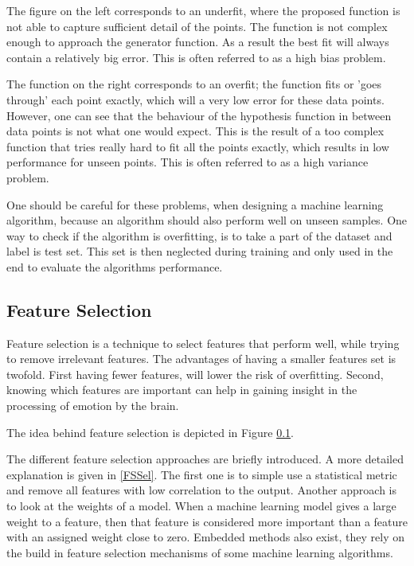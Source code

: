 \npar

The figure on the left corresponds to an underfit, where the proposed function is not able to capture sufficient detail of the points. The function is not complex enough to approach the generator function. As a result the best fit will always contain a relatively big error. This is often referred to as a high bias problem. 

\npar

The function on the right corresponds to an overfit; the function fits or 'goes through' each point exactly, which will a very low error for these data points. However, one can see that the behaviour of the hypothesis function in between data points is not what one would expect. This is the result of a too complex function that tries really hard to fit all the points exactly, which results in low performance for unseen points. This is often referred to as a high variance problem.

\npar

One should be careful for these problems, when designing a machine learning algorithm, because an algorithm should also perform well on unseen samples. One way to check if the algorithm is overfitting, is to take a part of the dataset and label is test set. This set is then neglected during training and only used in the end to evaluate the algorithms performance.

\subsection{Feature Selection}
Feature selection is a technique to select features that perform well, while trying to remove irrelevant features\citep{rfPaper}. The advantages of having a smaller features set is twofold. First having fewer features, will lower the risk of overfitting\citep{rfPaper}. Second, knowing which features are important can help in gaining insight in the processing of emotion by the brain. 

\npar

The idea behind feature selection is depicted in Figure \ref{}. 

The different feature selection approaches are briefly introduced. A more detailed explanation is given in \ref{FSSel}. The first one is to simple use a statistical metric and remove all features with low correlation to the output. Another approach is to look at the weights of a model. When a machine learning model gives a large weight to a feature, then that feature is considered more important than a feature with an assigned weight close to zero. Embedded methods also exist, they rely on the build in feature selection mechanisms of some machine learning algorithms.

